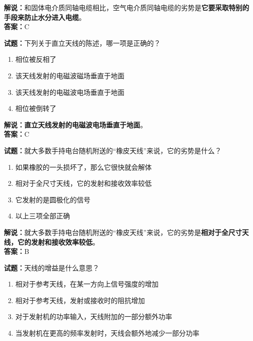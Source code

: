 \documentclass{ctexbook}
\begin{document}
\noindent\textbf{解说：}和固体电介质同轴电缆相比，空气电介质同轴电缆的劣势是\textbf{它要采取特别的手段来防止水分进入电缆}。\\\noindent\textbf{答案：}C%

\vspace{\baselineskip}

\noindent\textbf{试题：}下列关于直立天线的陈述，哪一项是正确的？

\begin{enumerate}[leftmargin=3em]
  \item 相位被反相了
  \item 该天线发射的电磁波磁场垂直于地面
  \item 该天线发射的电磁波电场垂直于地面
  \item 相位被倒转了
\end{enumerate}

\noindent\textbf{解说：}\textbf{直立天线发射的电磁波电场垂直于地面}。\\\noindent\textbf{答案：}C

\vspace{\baselineskip}

\noindent\textbf{试题：}就大多数手持电台随机附送的“橡皮天线”来说，它的劣势是什么？

\begin{enumerate}[leftmargin=3em]
  \item 如果橡胶的一头损坏了，那么它很快就会解体
  \item 相对于全尺寸天线，它的发射和接收效率较低
  \item 它发射的是圆极化的信号
  \item 以上三项全部正确
\end{enumerate}

\noindent\textbf{解说：}就大多数手持电台随机附送的“橡皮天线”来说，它的劣势是\textbf{相对于全尺寸天线，它的发射和接收效率较低}。\\\noindent\textbf{答案：}B

\vspace{\baselineskip}

\noindent\textbf{试题：}天线的增益是什么意思？

\begin{enumerate}[leftmargin=3em]
  \item 相对于参考天线，在某一方向上信号强度的增加
  \item 相对于参考天线，发射或接收时的阻抗增加
  \item 对于发射机的功率输入，天线附加的一部分额外功率
  \item 当发射机在更高的频率发射时，天线会额外地减少一部分功率
\end{enumerate}
\end{document}
